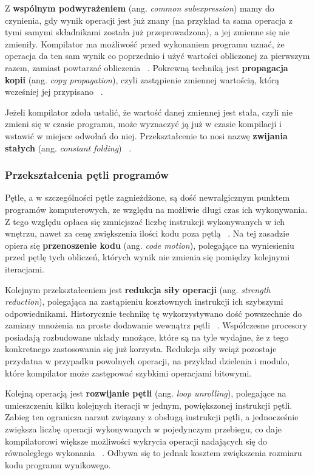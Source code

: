 Z \textbf{wspólnym podwyrażeniem} (ang. \textit{common subexpression}) mamy do czynienia, gdy wynik operacji jest już znany (na przykład ta sama operacja z tymi samymi składnikami została już przeprowadzona), a jej zmienne się nie zmieniły. Kompilator ma możliwość przed wykonaniem programu uznać, że operacja da ten sam wynik co poprzednio i użyć wartości obliczonej za pierwszym razem, zamiast powtarzać obliczenia ~\cite{Kompilatory_Aho}. Pokrewną techniką jest \textbf{propagacja kopii} (ang. \textit{copy propagation}), czyli zastąpienie zmiennej wartością, którą wcześniej jej przypisano ~\cite{Kompilatory_Aho}.

Jeżeli kompilator zdoła ustalić, że wartość danej zmiennej jest stała, czyli nie zmieni się w czasie programu, może wyznaczyć ją już w czasie kompilacji i wstawić w miejsce odwołań do niej. Przekształcenie to nosi nazwę \textbf{zwijania stałych} (ang. \textit{constant folding}) ~\cite{Kompilatory_Aho}. 


\subsubsection{Przekształcenia pętli programów}

Pętle, a w szczególności pętle zagnieżdżone, są dość newralgicznym punktem programów komputerowych, ze względu na możliwie długi czas ich wykonywania. Z tego względu opłaca się zmniejszać liczbę instrukcji wykonywanych w ich wnętrzu, nawet za cenę zwiększenia ilości kodu poza pętlą ~\cite{Kompilatory_Aho}. Na tej zasadzie opiera się \textbf{przenoszenie kodu} (ang. \textit{code motion}), polegające na wyniesieniu przed pętlę tych obliczeń, których wynik nie zmienia się pomiędzy kolejnymi iteracjami.

Kolejnym przekształceniem jest \textbf{redukcja siły operacji} (ang. \textit{strength reduction}), polegająca na zastąpieniu kosztownych instrukcji ich szybszymi odpowiednikami. Historycznie technikę tę wykorzystywano dość powszechnie do zamiany mnożenia na proste dodawanie wewnątrz pętli ~\cite{Kompilatory_Aho, ZielinskiDSP}. Współczesne procesory posiadają rozbudowane układy mnożące, które są na tyle wydajne, że z tego konkretnego zastosowania się już korzysta. Redukcja siły wciąż pozostaje przydatna w przypadku powolnych operacji, na przykład dzielenia i modulo, które kompilator może zastępować szybkimi operacjami bitowymi.

Kolejną operacją jest \textbf{rozwijanie pętli} (ang. \textit{loop unrolling}), polegające na umieszczeniu kilku kolejnych iteracji w jednym, powiększonej instrukcji pętli. Zabieg ten ogranicza narzut związany z obsługą instrukcji pętli, a jednocześnie zwiększa liczbę operacji wykonywanych w pojedynczym przebiegu, co daje kompilatorowi większe możliwości wykrycia operacji nadających się do równoległego wykonania ~\cite{Kompilatory_Aho}. Odbywa się to jednak kosztem zwiększenia rozmiaru kodu programu wynikowego.

